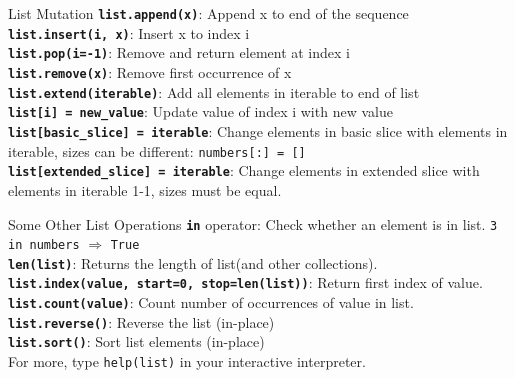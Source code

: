         \begin{frame}{List Mutation}
            \LARGE
            \textbf{\texttt{list.append(x)}}: Append x to end of the sequence\\
            \textbf{\texttt{list.insert(i, x)}}: Insert x to index i\\
            \textbf{\texttt{list.pop(i=-1)}}: Remove and return element at index i\\
            \textbf{\texttt{list.remove(x)}}: Remove first occurrence of x\\
            \textbf{\texttt{list.extend(iterable)}}: Add all elements in iterable to end of list\\
            \textbf{\texttt{list[i] = new\_value}}: Update value of index i with new value\\
            \textbf{\texttt{list[basic\_slice] = iterable}}: Change elements in basic slice with elements in iterable, sizes can be different: \texttt{numbers[:] = []}\\
            \textbf{\texttt{list[extended\_slice] = iterable}}: Change elements in extended slice with elements in iterable 1-1, sizes must be equal.\\
        \end{frame}

        \begin{frame}{Some Other List Operations}
            \LARGE
            \textbf{\texttt{in}} operator: Check whether an element is in list. \texttt{3 in numbers} $\Rightarrow$ \texttt{True}\\
            \textbf{\texttt{len(list)}}: Returns the length of list(and other collections).\\
            \textbf{\texttt{list.index(value, start=0, stop=len(list))}}: Return first index of value.\\
            \textbf{\texttt{list.count(value)}}: Count number of occurrences of value in list.\\
            \textbf{\texttt{list.reverse()}}: Reverse the list (in-place)\\
            \textbf{\texttt{list.sort()}}: Sort list elements (in-place)\\
            For more, type \texttt{help(list)} in your interactive interpreter.
        \end{frame}

